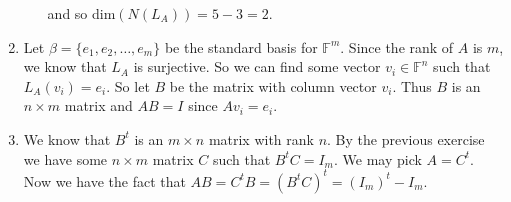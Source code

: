 \begin{enumerate}
\begin{enumerate}
and so dim$(N(L_A))=5-3=2$.
\end{enumerate}
\item Let $\beta =\{e_1,e_2,\ldots ,e_m\}$ be the standard basis for $\mathbb{F}^m$. Since the rank of $A$ is $m$, we know that $L_A$ is surjective. So we can find some vector $v_i\in \mathbb{F}^n$ such that $L_A(v_i)=e_i$. So let $B$ be the matrix with column vector $v_i$. Thus $B$ is an $n\times m$ matrix and $AB=I$ since $Av_i=e_i$.
\item We know that $B^t$ is an $m\times n$ matrix with rank $n$. By the previous exercise we have some $n\times m$ matrix $C$ such that $B^tC=I_m$. We may pick $A=C^t$. Now we have the fact that $AB=C^tB=(B^tC)^t=(I_m)^t-I_m$.

\end{enumerate}
